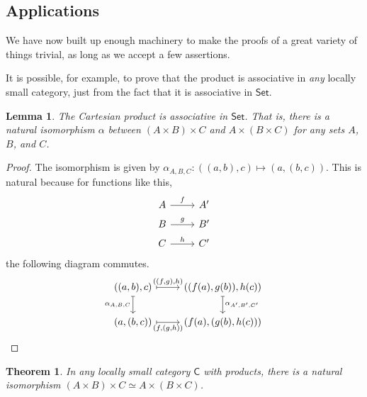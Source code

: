 \documentclass[a4paper,10pt]{scrreprt}
\theoremstyle{definition}
\theoremstyle{plain}
\newtheorem{theorem}{Theorem}[section]
\newtheorem{lemma}{Lemma}[section]
\theoremstyle{remark}
\begin{document}
\subsection{Applications}
We have now built up enough machinery to make the proofs of a great variety of things trivial, as long as we accept a few assertions. 

It is possible, for example, to prove that the product is associative in \emph{any} locally small category, just from the fact that it is associative in $\mathsf{Set}$.
\begin{lemma}
  The Cartesian product is associative in $\mathsf{Set}$. That is, there is a natural isomorphism $\alpha$ between $(A \times B) \times C$ and $A \times (B \times C)$ for any sets $A$, $B$, and $C$.
\end{lemma}
\begin{proof}
  The isomorphism is given by $\alpha_{A, B, C}\colon ((a, b), c) \mapsto (a, (b, c))$. This is natural because for functions like this,
  \begin{equation*}
    \begin{tikzcd}[row sep=tiny]
      A 
      \arrow[r, "f"]
      & A'
      \\
      B 
      \arrow[r, "g"]
      & B'
      \\
      C 
      \arrow[r, "h"]
      & C'
    \end{tikzcd}
  \end{equation*}
  the following diagram commutes.
  \begin{equation*}
    \begin{tikzcd}
      ((a, b), c)
      \arrow[r, mapsto, "{((f, g), h)}"]
      \arrow[d, mapsto, swap, "{\alpha_{A, B, C}}"]
      & ((f(a), g(b)), h(c))
      \arrow[d, mapsto, "{\alpha_{A', B', C'}}"]
      \\
      (a, (b, c))
      \arrow[r, mapsto, swap, "{(f, (g, h))}"]
      & (f(a), (g(b), h(c)))
    \end{tikzcd}
  \end{equation*}
\end{proof}
\begin{theorem}
  \label{thm:categoricalproductisassociative}
  In any locally small category $\mathsf{C}$ with products, there is a natural isomorphism $(A \times B) \times C \simeq A \times (B \times C)$.
\end{theorem}
\end{document}
